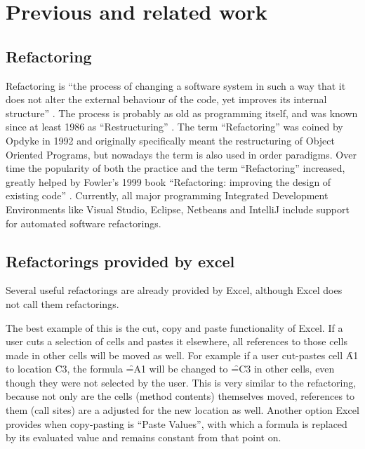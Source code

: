 
\chapter{Previous and related work}
\label{chapter:previouswork}

\section{Refactoring}

Refactoring is ``the process of changing a software system in such a way that it does not alter the external behaviour of the code, yet improves its internal structure'' \cite{opdyke1992refactoring}.
The process is probably as old as programming itself, and was known since at least 1986 as ``Restructuring'' \cite{arnold1986introduction}.
The term ``Refactoring'' was coined by Opdyke in 1992 \cite{opdyke1992refactoring} and originally specifically meant the restructuring of Object Oriented Programs, but nowadays the term is also used in order paradigms.
Over time the popularity of both the practice and the term ``Refactoring'' increased, greatly helped by Fowler's 1999 book ``Refactoring: improving the design of existing code'' \cite{fowler1999refactoring}.
Currently, all major programming Integrated Development Environments like Visual Studio, Eclipse, Netbeans and IntelliJ include support for automated software refactorings.

\section{Refactorings provided by excel}

Several useful refactorings are already provided by Excel, although Excel does not call them refactorings.

The best example of this is the cut, copy and paste functionality of Excel.
If a user cuts a selection of cells and pastes it elsewhere, all references to those cells made in other cells will be moved as well.
For example if a user cut-pastes cell \f{A1} to location \f{C3}, the formula \f{=A1} will be changed to \f{=C3} in other cells, even though they were not selected by the user.
This is very similar to the  \cite{fowler1999refactoring} refactoring, because not only are the cells (method contents) themselves moved, references to them (call sites) are a adjusted for the new location as well.
Another option Excel provides when copy-pasting is ``Paste Values'', with which a formula is replaced by its evaluated value and remains constant from that point on.


